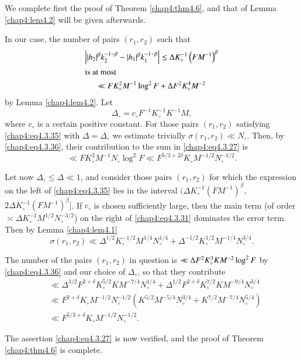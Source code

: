 We complete first the proof of Theorem \ref{chap4:thm4.6}, and that of Lemma \ref{chap4:lem4.2} will be given afterwards.

In our case, the number of pairs $(r_1,r_2)$ such that 
\begin{gather}
\left||h_2|^\beta k_2^{-1-\beta}-|h_1|^\beta k_1^{-1-\beta}\right|\leq\Delta K_\circ^{-1} \left(FM^{-1}\right)^\beta \label{chap4:eq4.3.35}\\
\intertext{is at most}
\ll FK_\circ^2M^{-1}\log^2F+\Delta F^2K_\circ^4M^{-2}\label{chap4:eq4.3.36}
\end{gather}
by Lemma \ref{chap4:lem4.2}. Let 
$$
\Delta_\circ=c_\circ F^{-1}K_\circ^{-1}K^{-1}M,
$$
where $c_\circ$ is a certain positive constant. For those pairs $(r_1,r_2)$ satisfying \eqref{chap4:eq4.3.35} with $\Delta=\Delta_\circ$ we estimate trivially $\sigma(r_1,r_2)\ll N_\circ$. Then, by \eqref{chap4:eq4.3.36}, their contribution to the sum in \eqref{chap4:eq4.3.27} is 
$$
\ll FK_\circ^2M^{-1}N_\circ\log^2F\ll F^{5/3+2\delta}K_\circ M^{-1/2}N_\circ^{-1/2}.
$$\pageoriginale

Let now $\Delta_\circ\leq\Delta\ll 1$, and consider those pairs
$(r_1,r_2)$ for which the expression on the left of
\eqref{chap4:eq4.3.35} lies in the interval $(\Delta
K_\circ^{-1}(FM^{-1})^\beta$, $2\Delta K_\circ^{-1}(FM^{-1})^\beta]$. If
  $c_\circ$ is chosen sufficiently large, then the main term (of order
  $\asymp \Delta K_\circ^{-1}M^{1/2}N_\circ^{-3/2}$) on the right of
  \eqref{chap4:eq4.3.31} dominates the error term. Then by Lemma
  \ref{chap4:lem4.1} 
$$
\sigma\left(r_1,r_2\right)\ll\Delta^{1/2}K_\circ^{-1/2}M^{1/4}N_\circ^{1/4}+ \Delta^{-1/2}K_\circ^{1/2}M^{-1/4}N_\circ^{3/4}.
$$

The number of the pairs $(r_1,r_2)$ in question is $\ll\Delta F^2K_\circ^3KM^{-2}\break \log^2F$ by \eqref{chap4:eq4.3.36} and our choice of $\Delta_\circ$, so that they contribute
\begin{align*}
&\ll \Delta^{3/2}F^{2+\delta}K_\circ^{5/2}KM^{-7/4}N_\circ^{1/4}+\Delta^{1/2}F^{2+\delta} K_\circ^{7/2}KM^{-9/4}N_\circ^{3/4}\\
&\ll F^{2+\delta}K_\circ M^{-1/2}N_\circ^{-1/2}\left(K^{5/2}M^{-5/4}N_\circ^{3/4}+K^{7/2} M^{-7/4}N_\circ^{5/4}\right)\\
&\ll F^{5/3+\delta}K_\circ M^{-1/2}N_\circ^{-1/2}.
\end{align*}

The assertion \eqref{chap4:eq4.3.27} is now verified, and the proof of Theorem \ref{chap4:thm4.6} is complete.

